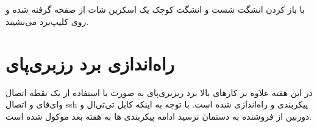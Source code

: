 \documentclass{article}
\begin{document}
\subsection{}
با باز کردن انشگت شست و انشگت کوچک یک اسکرین شات از صفحه گرفته شده و روی کلیپ‌برد می‌نشیند.

\section{راه‌اندازی برد رزبری‌پای}
در این هفته علاوه بر کار‌های بالا برد ریزبری‌پای به صورت  با استفاده از یک نقطه اتصال وای‌فای و اتصال ssh پیکربندی و راه‌اندازی شده است. با توجه به اینکه کابل تی‌تی‌ال و دوربین از فروشنده به دستمان نرسید ادامه پیکربندی ها به هفته بعد موکول شده است.
\end{document}

